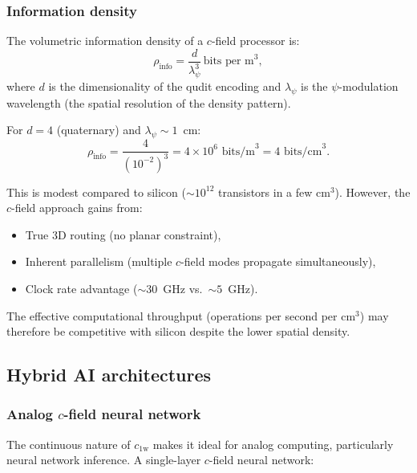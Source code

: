 \documentclass[aps,prd,twocolumn,superscriptaddress,nofootinbib,floatfix]{revtex4-2}
\newcommand{\psifield}{\psi}
\newcommand{\cfield}{c_{\text{1w}}}
\newcommand{\ee}[1]{\times 10^{#1}}
\begin{document}
\subsubsection{Information density}

The volumetric information density of a $c$-field processor is:
\begin{equation}
\rho_{\text{info}} = \frac{d}{\lambda_\psi^3}\,
\text{bits per m}^3,
\label{eq:info_density}
\end{equation}
where $d$ is the dimensionality of the qudit encoding and
$\lambda_\psi$ is the $\psifield$-modulation wavelength
(the spatial resolution of the density pattern).

For $d = 4$ (quaternary) and $\lambda_\psi \sim 1$~cm:
\begin{equation}
\rho_{\text{info}} = \frac{4}{(10^{-2})^3}
= 4\ee{6}\text{ bits/m}^3 = 4\text{ bits/cm}^3.
\label{eq:info_density_numerical}
\end{equation}

This is modest compared to silicon ($\sim 10^{12}$ transistors in
a few cm$^3$). However, the $c$-field approach gains from:
\begin{itemize}
\item True 3D routing (no planar constraint),
\item Inherent parallelism (multiple $c$-field modes propagate
simultaneously),
\item Clock rate advantage ($\sim 30$~GHz vs.\ $\sim 5$~GHz).
\end{itemize}

The effective computational throughput (operations per second per
cm$^3$) may therefore be competitive with silicon despite the lower
spatial density.

\subsection{Hybrid AI architectures}
\label{subsec:hybrid_AI}

\subsubsection{Analog $c$-field neural network}

The continuous nature of $\cfield$ makes it ideal for analog
computing, particularly neural network inference. A single-layer
$c$-field neural network:
\end{document}
